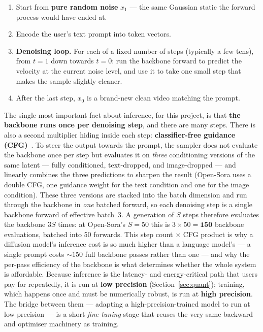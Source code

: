 \documentclass[11pt]{report}
\begin{document}
\begin{enumerate}
\item Start from \textbf{pure random noise} $x_1$ --- the same Gaussian
static the forward process would have ended at.
\item Encode the user's text prompt into token vectors.
\item \textbf{Denoising loop.} For each of a fixed number of steps
(typically a few tens), from $t=1$ down towards $t=0$: run the backbone
forward to predict the velocity at the current noise level, and use it to
take one small step that makes the sample slightly cleaner.
\item After the last step, $x_0$ is a brand-new clean video matching the
prompt.
\end{enumerate}

The single most important fact about inference, for this project, is that
\textbf{the backbone runs once per denoising step}, and there are many
steps. There is also a second multiplier hiding inside each step:
\textbf{classifier-free guidance (CFG)}~\cite{ho2022cfg}. To steer the output
towards the prompt, the sampler does not evaluate the backbone once per step
but evaluates it on \emph{three} conditioning versions of the same latent ---
fully conditioned, text-dropped, and image-dropped --- and linearly combines
the three predictions to sharpen the result (Open-Sora uses a double CFG,
one guidance weight for the text condition and one for the image condition).
These three versions are stacked into the batch dimension and run through the
backbone in \emph{one} batched forward, so each denoising step is a single
backbone forward of effective batch~3. A generation of $S$ steps therefore
evaluates the backbone $3S$ times: at Open-Sora's $S=50$ this is
$3\times 50 = \mathbf{150}$ backbone evaluations, batched into 50 forwards.
This step count $\times$ CFG product is why a diffusion model's inference
cost is so much higher than a language model's --- a single prompt costs
${\sim}150$ full backbone passes rather than one --- and why the per-pass
efficiency of the backbone is what determines whether the whole system is
affordable.
Because inference is the latency- and energy-critical path that users pay
for repeatedly, it is run at \textbf{low precision}
(Section~\ref{sec:quant}); training, which happens once and must be
numerically robust, is run at \textbf{high precision}. The bridge between
them --- adapting a high-precision-trained model to run at low precision
--- is a short \emph{fine-tuning} stage that reuses the very same backward
and optimiser machinery as training.
\end{document}
